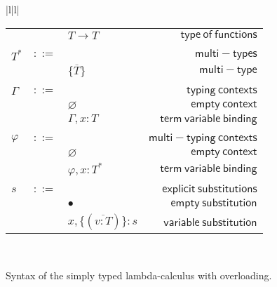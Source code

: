 \documentclass[preprint,authoryear,sort&compress,9pt,nocopyrightspace]{article}
\newcommand{\mtP}[1]{#1^{*}}
\newcommand{\mtC}[1]{\{\overline {#1}\}}
\newcommand{\emt}{\varphi}
\begin{document}
\begin{figure}
\begin{small}
\begin{center}
\begin{tabular}{|l|l|}
\begin{tabular}{l c l r}
&&$T \to T$&$\mathsf {type \ of \ functions}$\\
&&&\\
$\mtP{T}$&$::=$&&$\mathsf {multi-types}$\\
&&$\mtC{T}$&$\mathsf {multi-type}$\\
&&&\\
$\Gamma$&$::=$&&$\mathsf {typing \ contexts}$\\
&&$\varnothing$&$\mathsf {empty \ context}$\\
&&$\Gamma , x:T$&$\mathsf {term \ variable \ binding}$\\
&&&\\
$\emt$&$::=$&&$\mathsf {multi-typing \ contexts}$\\
&&$\varnothing$&$\mathsf {empty \ context}$\\
&&$\emt,x: \mtP{T}$&$\mathsf {term \ variable \ binding}$\\
&&&\\
$s$&$::=$&&$\mathsf {explicit \ substitutions}$\\
&&$ \bullet$&$\mathsf {empty \ substitution}$\\
&&$x,\{(\overline {v:T})\}:s$&$\mathsf {variable \ substitution}$\\
\end{tabular}\\
\hline
\end{tabular}
\caption{Syntax of the simply typed lambda-calculus with overloading.}
\label{figure:sencilla}
\end{center}
\end{small}
\end{figure}
\end{document}
